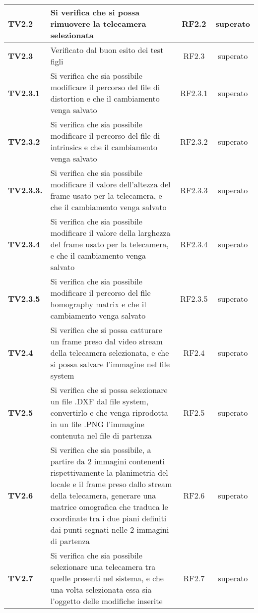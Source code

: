 \begin{center}
\begin{longtable}{ | l | p{5cm} | c | c |}
\textbf{TV2.2} & Si verifica che si possa rimuovere la telecamera selezionata & RF2.2 &  \textcolor{green!80!blue}{superato}  \\ \hline 
\textbf{TV2.3} & Verificato dal buon esito dei test figli & RF2.3 &  \textcolor{green!80!blue}{superato}  \\ \hline 
\textbf{TV2.3.1} & Si verifica che sia possibile modificare il percorso del file di distortion e che il cambiamento venga salvato & RF2.3.1 &  \textcolor{green!80!blue}{superato}  \\ \hline 
\textbf{TV2.3.2} & Si verifica che sia possibile modificare il percorso del file di intrinsics e che il cambiamento venga salvato & RF2.3.2 &  \textcolor{green!80!blue}{superato}  \\ \hline 
\textbf{TV2.3.3.} & Si verifica che sia possibile modificare il valore dell'altezza del frame usato per la telecamera, e che il cambiamento venga salvato & RF2.3.3 &  \textcolor{green!80!blue}{superato}  \\ \hline 
\textbf{TV2.3.4} & Si verifica che sia possibile modificare il valore della larghezza del frame usato per la telecamera, e che il cambiamento venga salvato & RF2.3.4 &  \textcolor{green!80!blue}{superato}  \\ \hline 
\textbf{TV2.3.5} & Si verifica che sia possibile modificare il percorso del file homography matrix e che il cambiamento venga salvato & RF2.3.5 &  \textcolor{green!80!blue}{superato}  \\ \hline 
\textbf{TV2.4} & Si verifica che si possa catturare un frame preso dal video stream della telecamera selezionata, e che si possa salvare l'immagine nel file system & RF2.4 &  \textcolor{green!80!blue}{superato}  \\ \hline 
\textbf{TV2.5} & Si verifica che si possa selezionare un file .DXF dal file system, convertirlo e che venga riprodotta in un file .PNG l'immagine contenuta nel file di partenza & RF2.5 &  \textcolor{green!80!blue}{superato}  \\ \hline 
\textbf{TV2.6} & Si verifica che sia possibile, a partire da 2 immagini contenenti rispettivamente la planimetria del locale e il frame preso dallo stream della telecamera, generare una matrice omografica che traduca le coordinate tra i due piani definiti dai punti segnati nelle 2 immagini di partenza & RF2.6 &  \textcolor{green!80!blue}{superato}  \\ \hline 
\textbf{TV2.7} & Si verifica che sia possibile selezionare una telecamera tra quelle presenti nel sistema, e che una volta selezionata essa sia l'oggetto delle modifiche inserite & RF2.7 &  \textcolor{green!80!blue}{superato}  \\ \hline 

\end{longtable}
\end{center}
